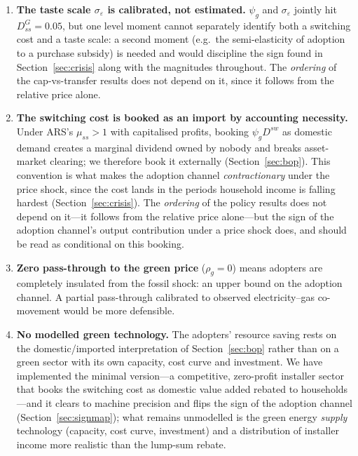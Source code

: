\documentclass[11pt,a4paper]{article}
\begin{document}
\begin{enumerate}\itemsep3pt

\item \textbf{The taste scale $\sigma_{\varepsilon}$ is calibrated, not
estimated.} $\psi_g$ and $\sigma_\varepsilon$ jointly hit $D^G_{ss}=0.05$, but
one level moment cannot separately identify both a switching cost and a taste
scale: a second moment (e.g.\ the semi-elasticity of adoption to a purchase
subsidy) is needed and would discipline the sign found in
Section~\ref{sec:crisis} along with the magnitudes throughout. The \emph{ordering} of the
cap-vs-transfer results does not depend on it, since it follows from the
relative price alone.

\item \textbf{The switching cost is booked as an import by accounting
necessity.} Under ARS's $\mu_{ss}>1$ with capitalised profits, booking
$\psi_g D^{sw}$ as domestic demand creates a marginal dividend owned by nobody
and breaks asset-market clearing; we therefore book it externally
(Section~\ref{sec:bop}). This convention is what makes the adoption channel
\emph{contractionary} under the price shock, since the cost lands in the
periods household income is falling hardest (Section~\ref{sec:crisis}). The \emph{ordering}
of the policy results does not depend on it---it follows from the relative
price alone---but the sign of the adoption channel's output contribution under
a price shock does, and should be read as conditional on this booking.

\item \textbf{Zero pass-through to the green price} ($\rho_g=0$) means
adopters are completely insulated from the fossil shock: an upper bound on
the adoption channel. A partial pass-through calibrated to observed
electricity--gas co-movement would be more defensible.

\item \textbf{No modelled green technology.} The adopters' resource saving
rests on the domestic/imported interpretation of Section~\ref{sec:bop} rather
than on a green sector with its own capacity, cost curve and investment. We
have implemented the minimal version---a competitive, zero-profit installer
sector that books the switching cost as domestic value added rebated to
households---and it clears to machine precision and flips the sign of the
adoption channel (Section~\ref{sec:signmap}); what remains unmodelled is the
green energy \emph{supply} technology (capacity, cost curve, investment) and a
distribution of installer income more realistic than the lump-sum rebate.


\end{enumerate}
\end{document}
